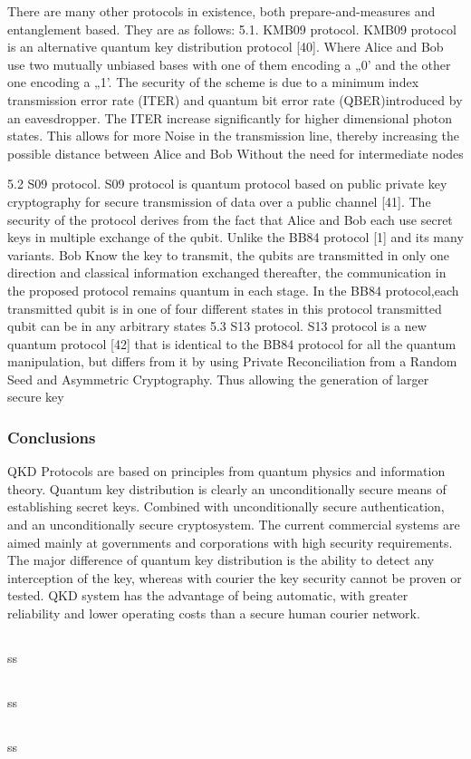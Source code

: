 There are many other protocols in existence, both prepare-and-measures and entanglement based. They are as follows:
5.1. KMB09 protocol. KMB09 protocol is an alternative quantum key distribution protocol [40]. Where Alice and Bob use two mutually unbiased bases with one of them encoding a „0' and the other one encoding a „1'. The security of the scheme is due to a minimum index transmission error rate (ITER) and quantum bit error rate (QBER)introduced by an eavesdropper.
The ITER increase significantly for higher dimensional photon states. This allows for more Noise in the transmission line, thereby increasing the possible distance between Alice and Bob Without the need for intermediate nodes

5.2 S09 protocol. S09 protocol is quantum protocol based on public private key cryptography for secure transmission of data over a public channel [41]. The security of the protocol derives from the fact that Alice and Bob each use secret keys in multiple exchange of the qubit. Unlike the BB84 protocol [1] and its many variants. Bob Know the key to transmit, the qubits are transmitted in only one direction and classical information exchanged thereafter, the communication in the proposed protocol remains quantum in each stage. In the BB84 protocol,each transmitted qubit is in one of four different states in this protocol transmitted qubit can be in any arbitrary states
5.3 S13 protocol. S13 protocol is a new quantum protocol [42] that is identical to the BB84 protocol for all the quantum manipulation, but differs from it by using Private Reconciliation from a Random Seed and Asymmetric Cryptography. Thus allowing the generation of larger secure key

\subsubsection{Conclusions}
QKD Protocols are based on principles from quantum physics and information theory. Quantum key distribution is clearly an unconditionally secure means of establishing secret keys. Combined with unconditionally secure authentication, and an unconditionally secure cryptosystem.
The current commercial systems are aimed mainly at governments and corporations with high security requirements. The major difference of quantum key distribution is the ability to detect any interception of the key, whereas with courier the key security cannot be proven or tested. QKD system has the advantage of being automatic, with greater reliability and lower operating costs than a secure human courier network.

\subsection{\trnas}
ss
\subsection{\review}
ss
\subsection{\dic}
ss
